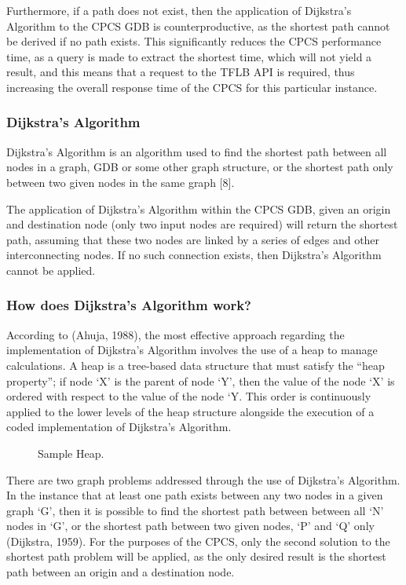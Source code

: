 \documentclass[12pt]{article}   	%
\begin{document}
Furthermore, if a path does not exist, then the application of Dijkstra’s Algorithm to the CPCS GDB is counterproductive, as the shortest path cannot be derived if no path exists. This significantly reduces the CPCS performance time, as a query is made to extract the shortest time, which will not yield a result, and this means that a request to the TFLB API is required, thus increasing the overall response time of the CPCS for this particular instance.

\subsubsection{Dijkstra’s Algorithm}
Dijkstra’s Algorithm is an algorithm used to find the shortest path between all nodes in a graph, GDB or some other graph structure, or the shortest path only between two given nodes in the same graph [8].

The application of Dijkstra’s Algorithm within the CPCS GDB, given an origin and destination node (only two input nodes are required) will return the shortest path, assuming that these two nodes are linked by a series of edges and other interconnecting nodes. If no such connection exists, then Dijkstra’s Algorithm cannot be applied.

\subsubsection{How does Dijkstra’s Algorithm work?}
According to (Ahuja, 1988), the most effective approach regarding the implementation of Dijkstra’s Algorithm involves the use of a heap to manage calculations. A heap is a tree-based data structure that must satisfy the “heap property”; if node ‘X’ is the parent of node ‘Y’, then the value of the node ‘X’ is ordered with respect to the value of the node ‘Y. This order is continuously applied to the lower levels of the heap structure alongside the execution of a coded implementation of Dijkstra’s Algorithm.

\noindent
\hfill
\begin{figure}[htp]

\caption{Sample Heap.}
\end{figure}
\hfill

There are two graph problems addressed through the use of Dijkstra’s Algorithm. In the instance that at least one path exists between any two nodes in a given graph ‘G’, then it is possible to find the shortest path between between all ‘N’ nodes in ‘G’, or the shortest path between two given nodes, ‘P’ and ‘Q’ only (Dijkstra, 1959). For the purposes of the CPCS, only the second solution to the shortest path problem will be applied, as the only desired result is the shortest path between an origin and a destination node.
\end{document}
